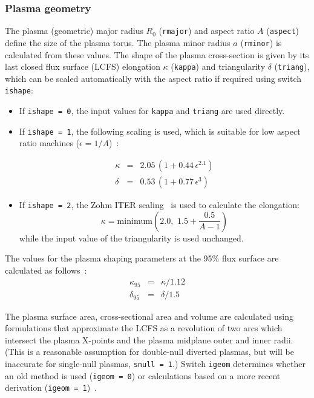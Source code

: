 \documentclass[11pt,a4paper]{report}
\begin{document}
\subsubsection{Plasma geometry}
\label{sec:plasma_geometry}

The plasma (geometric) major radius $R_0$ (\texttt{rmajor}) and aspect ratio
$A$ (\texttt{aspect}) define the size of the plasma torus. The plasma minor
radius $a$ (\texttt{rminor}) is calculated from these values. The shape of the
plasma cross-section is given by its last closed flux surface (LCFS) elongation
$\kappa$ (\texttt{kappa}) and triangularity $\delta$ (\texttt{triang}), which
can be scaled automatically with the aspect ratio if required using switch
\texttt{ishape}:

\begin{itemize}

\item If \texttt{ishape = 0}, the input values for \texttt{kappa} and
  \texttt{triang} are used directly.

\item If \texttt{ishape = 1}, the following scaling is used, which is suitable
  for low aspect ratio machines ($\epsilon = 1/A$)~\cite{storac}:

\begin{eqnarray}
\kappa & = & 2.05 \, (1 + 0.44 \, \epsilon^{2.1}) \\
\delta & = & 0.53 \, (1 + 0.77 \, \epsilon^3)
\end{eqnarray}

\item If \texttt{ishape = 2}, the Zohm ITER scaling~\cite{Zohm} is used to
  calculate the elongation:
\begin{equation}
\kappa = \mathrm{minimum} \left( 2.0, \, \, 1.5 + \frac{0.5}{A-1} \right)
\end{equation}
while the input value of the triangularity is used unchanged.

\end{itemize}

The values for the plasma shaping parameters at the 95\% flux surface are
calculated as follows~\cite{DEMOPhysicsGuidelines}:
\begin{eqnarray}
\kappa_{95} & = & \kappa / 1.12 \\
\delta_{95} & = & \delta / 1.5
\end{eqnarray}

The plasma surface area, cross-sectional area and volume are calculated using
formulations that approximate the LCFS as a revolution of two arcs which
intersect the plasma X-points and the plasma midplane outer and inner
radii. (This is a reasonable assumption for double-null diverted plasmas, but
will be inaccurate for single-null plasmas, \texttt{snull = 1}.) Switch
\texttt{igeom} determines whether an old method is used (\texttt{igeom = 0})
or calculations based on a more recent derivation (\texttt{igeom =
  1})~\cite{logbook14_41}.
\end{document}
